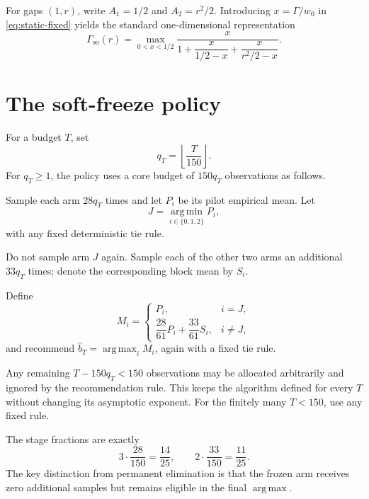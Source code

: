 \documentclass[11pt]{article}
\theoremstyle{definition}
\theoremstyle{remark}
\newcommand{\so}{\mathrm{so}}
\newcommand{\argmax}{\operatorname*{arg\,max}}
\newcommand{\argmin}{\operatorname*{arg\,min}}
\begin{document}
For gaps $(1,r)$, write $A_1=1/2$ and $A_2=r^2/2$. Introducing $x=\Gamma/w_0$ in \eqref{eq:static-fixed} yields the standard one-dimensional representation
\begin{equation}
\Gamma_{\so}(r)
=
\max_{0<x<1/2}
\frac{x}
{1+\dfrac{x}{1/2-x}+\dfrac{x}{r^2/2-x}}.
\label{eq:oracle-1d}
\end{equation}

\section{The soft-freeze policy}

For a budget $T$, set
\[
q_T=\left\lfloor\frac{T}{150}\right\rfloor.
\]
For $q_T\ge1$, the policy uses a core budget of $150q_T$ observations as follows.

\begin{description}[leftmargin=2.1cm,style=nextline]
\item[Stage 1.] Sample each arm $28q_T$ times and let $P_i$ be its pilot empirical mean. Let
\[
J=\argmin_{i\in\{0,1,2\}} P_i,
\]
with any fixed deterministic tie rule.

\item[Stage 2.] Do not sample arm $J$ again. Sample each of the other two arms an additional $33q_T$ times; denote the corresponding block mean by $S_i$.

\item[Recommendation.] Define
\begin{equation}
M_i=
\begin{cases}
P_i, & i=J,\\[1mm]
\dfrac{28}{61}P_i+\dfrac{33}{61}S_i, & i\ne J,
\end{cases}
\label{eq:score}
\end{equation}
and recommend $\widehat b_T=\argmax_i M_i$, again with a fixed tie rule.
\end{description}

Any remaining $T-150q_T<150$ observations may be allocated arbitrarily and ignored by the recommendation rule. This keeps the algorithm defined for every $T$ without changing its asymptotic exponent. For the finitely many $T<150$, use any fixed rule.

The stage fractions are exactly
\[
3\cdot\frac{28}{150}=\frac{14}{25},
\qquad
2\cdot\frac{33}{150}=\frac{11}{25}.
\]
The key distinction from permanent elimination is that the frozen arm receives zero additional samples but remains eligible in the final $\argmax$.
\end{document}
